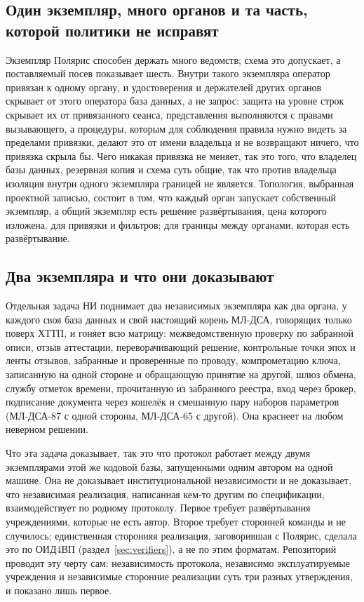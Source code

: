 \subsection{Один экземпляр, много органов и та часть, которой политики не исправят}

Экземпляр Полярис способен держать много ведомств; схема это допускает, а поставляемый посев
показывает шесть. Внутри такого экземпляра оператор привязан к одному органу, и удостоверения и
держателей других органов скрывает от этого оператора база данных, а не запрос: защита на уровне
строк скрывает их от привязанного сеанса, представления выполняются с правами вызывающего, а
процедуры, которым для соблюдения правила нужно видеть за пределами привязки, делают это от имени
владельца и не возвращают ничего, что привязка скрыла бы. Чего никакая привязка не меняет, так это
того, что владелец базы данных, резервная копия и схема суть общие, так что против владельца
изоляция внутри одного экземпляра границей не является. Топология,
выбранная проектной записью, состоит в том, что каждый орган запускает собственный экземпляр, а
общий экземпляр есть решение развёртывания, цена которого изложена. \sImplMark{} для привязки и
фильтров; \sExt{} для границы между органами, которая есть развёртывание.

\subsection{Два экземпляра и что они доказывают}

Отдельная задача НИ поднимает два независимых экземпляра как два органа, у каждого своя база
данных и свой настоящий корень МЛ-ДСА, говорящих только поверх ХТТП, и гоняет всю матрицу:
межведомственную проверку по забранной описи, отзыв аттестации, переворачивающий решение,
контрольные точки эпох и ленты отзывов, забранные и проверенные по проводу, компрометацию ключа,
записанную на одной стороне и обращающую принятие на другой, шлюз обмена, службу отметок времени,
прочитанную из забранного реестра, вход через брокер, подписание документа через кошелёк и
смешанную пару наборов параметров (МЛ-ДСА-87 с одной стороны, МЛ-ДСА-65 с другой). Она краснеет
на любом неверном решении. \sImpl

Что эта задача доказывает, так это что протокол работает между двумя экземплярами этой же кодовой
базы, запущенными одним автором на одной машине. Она не доказывает институциональной
независимости и не доказывает, что независимая реализация, написанная кем-то другим по
спецификации, взаимодействует по родному протоколу. Первое требует развёртывания учреждениями,
которые не есть автор. Второе требует сторонней команды и не случилось; единственная сторонняя
реализация, заговорившая с Полярис, сделала это по ОИД4ВП (раздел~\ref{sec:verifiers}), а не по
этим форматам. Репозиторий проводит эту черту сам: независимость протокола, независимо
эксплуатируемые учреждения и независимые сторонние реализации суть три разных утверждения, и
показано лишь первое. \sExt

